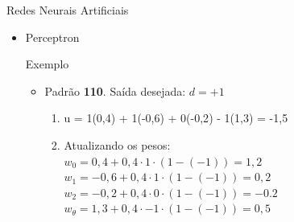 \documentclass{libs/ufc_format}
\begin{document}
\begin{frame}{Redes Neurais Artificiais}
    \begin{itemize}
        \item Perceptron\\
        \begin{exampleblock}{Exemplo}
            \begin{itemize}
                \justifying
                \item Padrão \textbf{110}. Saída desejada: $d = +1$
                    \begin{enumerate}
                        \item<2-> u = \alert<3>{1}(\alert<4>{0,4}) + \alert<3>{1}(\alert<4>{-0,6}) + \alert<3>{0}(\alert<4>{-0,2}) \alert<3>{- 1}(\alert<4>{1,3}) = -1,5\\
                        \item<5-> Atualizando os pesos:\\
                        $w_{0} = 0,4 + 0,4\cdot 1\cdot(1 - (-1)) = 1,2$\\
                        $w_{1} = -0,6 + 0,4\cdot 1\cdot(1 - (-1)) = 0,2$\\
                        $w_{2} = -0,2 + 0,4\cdot 0\cdot(1 - (-1)) = -0.2$\\
                        $w_{\theta} = 1,3 + 0,4\cdot-1\cdot(1 - (-1)) = 0,5$
                    \end{enumerate}
            \end{itemize}
        \end{exampleblock}
    \end{itemize}
\end{frame}
\end{document}
